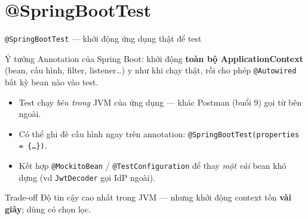 \documentclass[aspectratio=169,12pt]{beamer}
\begin{document}
\section{@SpringBootTest}

\begin{frame}{\texttt{@SpringBootTest} --- khởi động ứng dụng thật để test}
  \begin{block}{Ý tưởng}
    Annotation của Spring Boot: khởi động \textbf{toàn bộ ApplicationContext}
    (bean, cấu hình, filter, listener\ldots) y như khi chạy thật, rồi cho phép
    \texttt{@Autowired} bất kỳ bean nào vào test.
  \end{block}
  \begin{itemize}
    \item Test chạy \emph{bên trong} JVM của ứng dụng --- khác Postman
      (buổi 9) gọi từ bên ngoài.
    \item Có thể ghi đè cấu hình ngay trên annotation:
      \texttt{@SpringBootTest(properties = \{\ldots\})}.
    \item Kết hợp \texttt{@MockitoBean} / \texttt{@TestConfiguration} để thay
      \emph{một vài} bean khó dựng (vd \texttt{JwtDecoder} gọi IdP ngoài).
  \end{itemize}
  \begin{alertblock}{Trade-off}
    Độ tin cậy cao nhất trong JVM --- nhưng khởi động context tốn
    \textbf{vài giây}; dùng có chọn lọc.
  \end{alertblock}
\end{frame}
\end{document}
